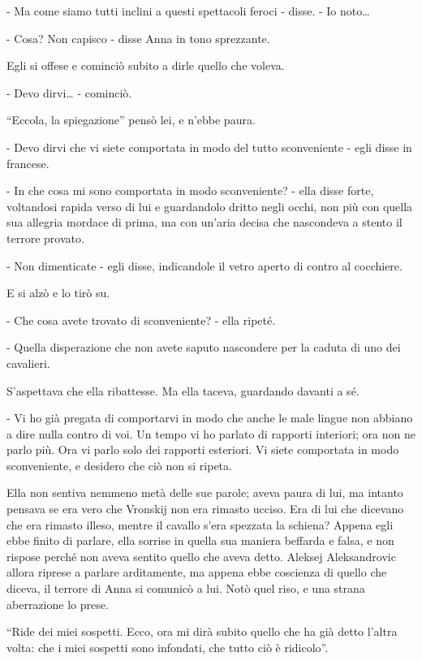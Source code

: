 - Ma come siamo tutti inclini a questi spettacoli feroci - disse. - Io noto\ldots{} 

- Cosa? Non capisco - disse Anna in tono sprezzante. 

Egli si offese e cominciò subito a dirle quello che voleva. 

- Devo dirvi\ldots{} - cominciò. 

``Eccola, la spiegazione'' pensò lei, e n'ebbe paura. 

- Devo dirvi che vi siete comportata in modo del tutto sconveniente - egli disse in francese. 

- In che cosa mi sono comportata in modo sconveniente? - ella disse forte, voltandosi rapida verso di lui e guardandolo dritto negli occhi, non più con quella sua allegria mordace di prima, ma con un'aria decisa che nascondeva a stento il terrore provato. 

- Non dimenticate - egli disse, indicandole il vetro aperto di contro al cocchiere. 

E si alzò e lo tirò su. 

- Che cosa avete trovato di sconveniente? - ella ripeté. 

- Quella disperazione che non avete saputo nascondere per la caduta di uno dei cavalieri. 

S'aspettava che ella ribattesse. Ma ella taceva, guardando davanti a sé. 

- Vi ho già pregata di comportarvi in modo che anche le male lingue non abbiano a dire nulla contro di voi. Un tempo vi ho parlato di rapporti interiori; ora non ne parlo più. Ora vi parlo solo dei rapporti esteriori. Vi siete comportata in modo sconveniente, e desidero che ciò non si ripeta. 

Ella non sentiva nemmeno metà delle sue parole; aveva paura di lui, ma intanto pensava se era vero che Vronskij non era rimasto ucciso. Era di lui che dicevano che era rimasto illeso, mentre il cavallo s'era spezzata la schiena? Appena egli ebbe finito di parlare, ella sorrise in quella sua maniera beffarda e falsa, e non rispose perché non aveva sentito quello che aveva detto. Aleksej Aleksandrovic allora riprese a parlare arditamente, ma appena ebbe coscienza di quello che diceva, il terrore di Anna si comunicò a lui. Notò quel riso, e una strana aberrazione lo prese. 

``Ride dei miei sospetti. Ecco, ora mi dirà subito quello che ha già detto l'altra volta: che i miei sospetti sono infondati, che tutto ciò è ridicolo''. 

